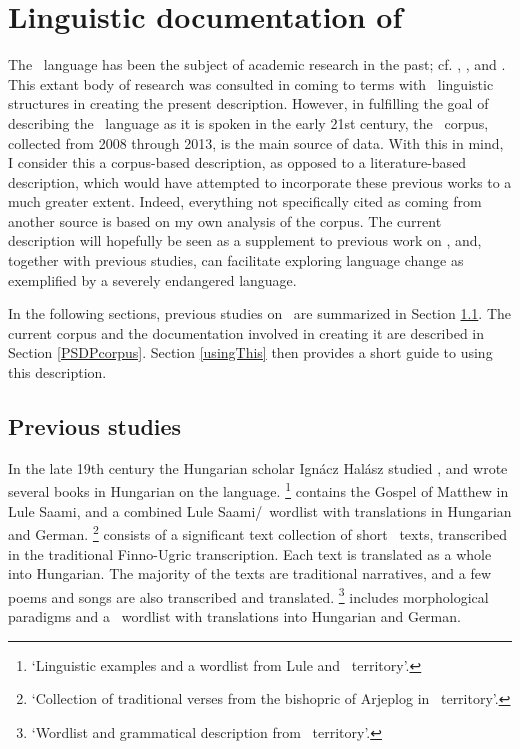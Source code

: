 \section{Linguistic documentation of \PS}\label{lingDoc}
The \PS\ language has been the subject of academic research in the past; cf. \citet{Halasz1896}, \citet{Lagercrantz1926}, \citet{Ruong1943} and \citet{Lehtiranta1992}. %
This extant body of research was consulted in coming to terms with \PS\ linguistic structures in creating the present description. 
However, in fulfilling the goal of describing the \PS\ language as it is spoken in the early 21st century, the \PSDP\ corpus, collected from 2008 through 2013, is the main source of data. With this in mind, I consider this a corpus-based description, as opposed to a literature-based description, which would have attempted to incorporate these previous works to a much greater extent. Indeed, everything not specifically cited as coming from another source is based on my own analysis of the corpus. 
The current description will hopefully be seen as a supplement to previous work on \PS, and, together with previous studies, can facilitate exploring language change as exemplified by a severely endangered language. 

In the following sections, previous studies on \PS\ are summarized in Section \ref{previousWork}. The current corpus and the documentation involved in creating it are described in Section \ref{PSDPcorpus}. Section \ref{usingThis} then provides a short guide to using this description. 

\subsection{Previous studies}\label{previousWork}
In the late 19th century the Hungarian scholar Ignácz Halász studied \PS, and wrote several books in Hungarian on the language. 
\footnote{‘Linguistic examples and a wordlist from Lule and \PS\ territory’.} \citep{Halasz1885} contains the Gospel of Matthew in Lule Saami, and a combined Lule Saami/\PS\ wordlist with translations in Hungarian and German. 
\footnote{‘Collection of traditional verses from the bishopric of Arjeplog in \PS\ territory’.} \citep{Halasz1893} 
consists of a significant text collection of short \PS\ texts, transcribed in the traditional Finno-Ugric transcription. Each text is translated as a whole into Hungarian. The majority of the texts are traditional narratives, %
and a few poems and songs are also transcribed and translated. 
\footnote{‘Wordlist and grammatical description from \PS\ territory’.} \citep{Halasz1896} 
includes morphological paradigms and a \PS\ wordlist with translations into Hungarian and German. 

